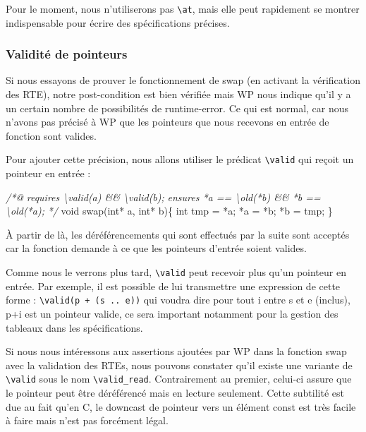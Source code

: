 \documentclass[12pt,francais,]{scrbook}
\newenvironment{Shaded}{}{}
\newcommand{\DataTypeTok}[1]{\textcolor[rgb]{0.56,0.13,0.00}{{#1}}}
\newcommand{\CommentTok}[1]{\textcolor[rgb]{0.38,0.63,0.69}{\textit{{#1}}}}
\newcommand{\NormalTok}[1]{{#1}}
\begin{document}
Pour le moment, nous n'utiliserons pas \texttt{\textbackslash{}at}, mais
elle peut rapidement se montrer indispensable pour écrire des
spécifications précises.

\subsubsection{Validité de pointeurs}\label{validituxe9-de-pointeurs}

Si nous essayons de prouver le fonctionnement de swap (en activant la
vérification des RTE), notre post-condition est bien vérifiée mais WP
nous indique qu'il y a un certain nombre de possibilités de
runtime-error. Ce qui est normal, car nous n'avons pas précisé à WP que
les pointeurs que nous recevons en entrée de fonction sont valides.

Pour ajouter cette précision, nous allons utiliser le prédicat
\texttt{\textbackslash{}valid} qui reçoit un pointeur en entrée :

\begin{footnotesize}\begin{Shaded}
\begin{Highlighting}[]
\CommentTok{/*@}
\CommentTok{  requires \textbackslash{}valid(a) && \textbackslash{}valid(b);}
\CommentTok{  ensures  *a == \textbackslash{}old(*b) && *b == \textbackslash{}old(*a);}
\CommentTok{*/}
\DataTypeTok{void} \NormalTok{swap(}\DataTypeTok{int}\NormalTok{* a, }\DataTypeTok{int}\NormalTok{* b)\{}
  \DataTypeTok{int} \NormalTok{tmp = *a;}
  \NormalTok{*a = *b;}
  \NormalTok{*b = tmp;}
\NormalTok{\}}
\end{Highlighting}
\end{Shaded}\end{footnotesize}

À partir de là, les déréférencements qui sont effectués par la suite
sont acceptés car la fonction demande à ce que les pointeurs d'entrée
soient valides.

Comme nous le verrons plus tard, \texttt{\textbackslash{}valid} peut
recevoir plus qu'un pointeur en entrée. Par exemple, il est possible de
lui transmettre une expression de cette forme :
\texttt{\textbackslash{}valid(p\ +\ (s\ ..\ e))} qui voudra dire \og{}pour
tout i entre s et e (inclus), p+i est un pointeur valide\fg{}, ce sera
important notamment pour la gestion des tableaux dans les
spécifications.

Si nous nous intéressons aux assertions ajoutées par WP dans la fonction
swap avec la validation des RTEs, nous pouvons constater qu'il existe
une variante de \texttt{\textbackslash{}valid} sous le nom
\texttt{\textbackslash{}valid\_read}. Contrairement au premier, celui-ci
assure que le pointeur peut être déréférencé mais en lecture seulement.
Cette subtilité est due au fait qu'en C, le downcast de pointeur vers un
élément const est très facile à faire mais n'est pas forcément légal.
\end{document}
